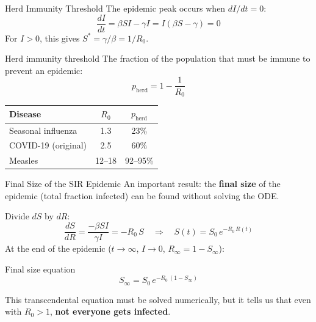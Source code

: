 \begin{frame}{Herd Immunity Threshold}
\small
The epidemic peak occurs when $dI/dt = 0$:
  \[
    \frac{dI}{dt} = \beta S I - \gamma I = I(\beta S - \gamma) = 0
  \]
  For $I > 0$, this gives $S^* = \gamma / \beta = 1 / R_0$.
  \pause
  \vfill
  \begin{block}{Herd immunity threshold}
    The fraction of the population that must be immune to prevent an epidemic:
    \[
      p_{\text{herd}} = 1 - \frac{1}{R_0}
    \]
  \end{block}
  \vfill
  \begin{center}
  \small
  \begin{tabular}{lcc}
    \toprule
    \textbf{Disease} & $R_0$ & $p_{\text{herd}}$ \\
    \midrule
    Seasonal influenza & 1.3 & 23\% \\
    COVID-19 (original) & 2.5 & 60\% \\
    Measles & 12--18 & 92--95\% \\
    \bottomrule
  \end{tabular}
  \end{center}
\end{frame}

\begin{frame}{Final Size of the SIR Epidemic}
\small
An important result: the \textbf{final size} of the epidemic (total fraction infected) can be found without solving the ODE.

Divide $dS$ by $dR$:
  \[
    \frac{dS}{dR} = \frac{-\beta S I}{\gamma I} = -R_0\, S
    \quad\Rightarrow\quad
    S(t) = S_0\, e^{-R_0\, R(t)}
  \]
  \pause
  At the end of the epidemic ($t \to \infty$, $I \to 0$, $R_{\infty} = 1 - S_{\infty}$):
  \begin{block}{Final size equation}
    \[
      S_{\infty} = S_0\, e^{-R_0\,(1 - S_{\infty})}
    \]
  \end{block}
  This transcendental equation must be solved numerically, but it tells us that even with $R_0 > 1$, \textbf{not everyone gets infected}.
\end{frame}

